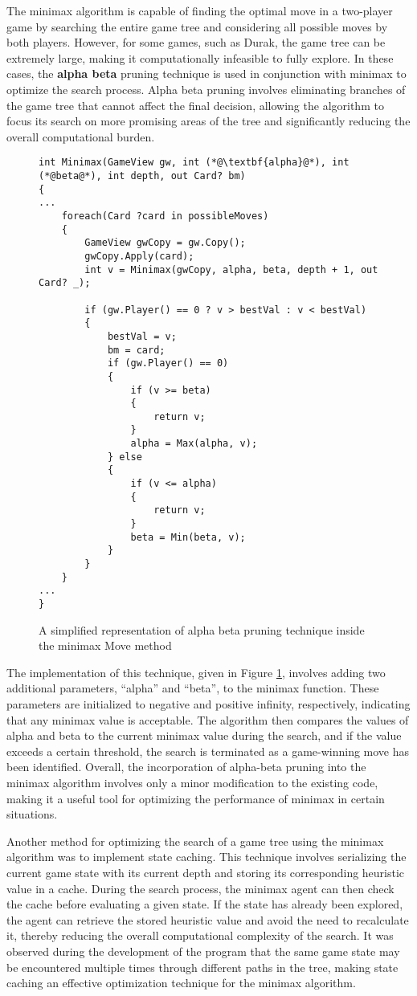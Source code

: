 The minimax algorithm is capable of finding the optimal move in a two-player game by searching the entire game tree and considering all possible moves by both players. However, for some games, such as Durak, the game tree can be extremely large, making it computationally infeasible to fully explore. In these cases, the \textbf{alpha beta} pruning technique is used in conjunction with minimax to optimize the search process. Alpha beta pruning involves eliminating branches of the game tree that cannot affect the final decision, allowing the algorithm to focus its search on more promising areas of the tree and significantly reducing the overall computational burden.

\begin{figure}[h]
\captionsetup{justification=centering}
\begin{lstlisting}
int Minimax(GameView gw, int (*@\textbf{alpha}@*), int (*@beta@*), int depth, out Card? bm)
{
...
	foreach(Card ?card in possibleMoves)
	{
		GameView gwCopy = gw.Copy();
		gwCopy.Apply(card);
		int v = Minimax(gwCopy, alpha, beta, depth + 1, out Card? _);

		if (gw.Player() == 0 ? v > bestVal : v < bestVal)
		{
			bestVal = v;
			bm = card;
			if (gw.Player() == 0)
			{
				if (v >= beta)
				{
					return v;
				}
				alpha = Max(alpha, v);
			} else
			{
				if (v <= alpha)
				{
					return v;
				}
				beta = Min(beta, v);
			}
		}
	}
...
}
\end{lstlisting}
\caption{A simplified representation of alpha beta pruning technique inside the minimax Move method}
\label{fig:alphabeta}
\end{figure}

The implementation of this technique, given in Figure \ref{fig:alphabeta}, involves adding two additional parameters, ``alpha'' and ``beta'', to the minimax function. These parameters are initialized to negative and positive infinity, respectively, indicating that any minimax value is acceptable. The algorithm then compares the values of alpha and beta to the current minimax value during the search, and if the value exceeds a certain threshold, the search is terminated as a game-winning move has been identified. Overall, the incorporation of alpha-beta pruning into the minimax algorithm involves only a minor modification to the existing code, making it a useful tool for optimizing the performance of minimax in certain situations.

Another method for optimizing the search of a game tree using the minimax algorithm was to implement state caching. This technique involves serializing the current game state with its current depth and storing its corresponding heuristic value in a cache. During the search process, the minimax agent can then check the cache before evaluating a given state. If the state has already been explored, the agent can retrieve the stored heuristic value and avoid the need to recalculate it, thereby reducing the overall computational complexity of the search. It was observed during the development of the program that the same game state may be encountered multiple times through different paths in the tree, making state caching an effective optimization technique for the minimax algorithm.

